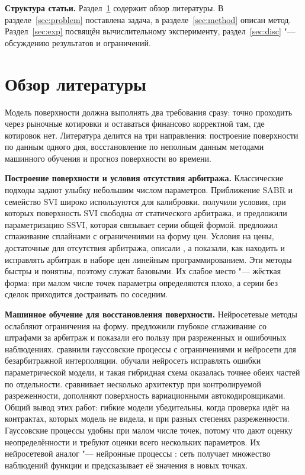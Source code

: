 \documentclass{article}
\begin{document}
\textbf{Структура статьи.} Раздел~\ref{sec:rw} содержит обзор литературы. В разделе~\ref{sec:problem} поставлена задача, в разделе~\ref{sec:method} описан метод. Раздел~\ref{sec:exp} посвящён вычислительному эксперименту, раздел~\ref{sec:disc} "--- обсуждению результатов и ограничений.

\section{Обзор литературы}\label{sec:rw}

Модель поверхности должна выполнять два требования сразу: точно проходить через рыночные котировки и оставаться финансово корректной там, где котировок нет. Литература делится на три направления: построение поверхности по данным одного дня, восстановление по неполным данным методами машинного обучения и прогноз поверхности во времени.

\textbf{Построение поверхности и условия отсутствия арбитража.}
Классические подходы задают улыбку небольшим числом параметров. Приближение SABR \citep{hagan2002sabr} и семейство SVI широко используются для калибровки. \citet{gatheral2014arbitrage} получили условия, при которых поверхность SVI свободна от статического арбитража, и предложили параметризацию SSVI, которая связывает серии общей формой. \citet{fengler2009arbitrage} предложил сглаживание сплайнами с ограничениями на форму цен. Условия на цены, достаточные для отсутствия арбитража, описали \citet{carr2005note}, а \citet{cohen2020detecting} показали, как находить и исправлять арбитраж в наборе цен линейным программированием. Эти методы быстры и понятны, поэтому служат базовыми. Их слабое место "--- жёсткая форма: при малом числе точек параметры определяются плохо, а серии без сделок приходится достраивать по соседним.

\textbf{Машинное обучение для восстановления поверхности.}
Нейросетевые методы ослабляют ограничения на форму. \citet{ackerer2020deep} предложили глубокое сглаживание со штрафами за арбитраж и показали его пользу при разреженных и ошибочных наблюдениях. \citet{chataigner2021shape} сравнили гауссовские процессы с ограничениями и нейросети для безарбитражной интерполяции. \citet{almeida2023machine} обучали нейросеть исправлять ошибки параметрической модели, и такая гибридная схема оказалась точнее обеих частей по отдельности. \citet{rodriguez2026reconstruction} сравнивает несколько архитектур при контролируемой разреженности, \citet{nteumagne2025vae} дополняют поверхность вариационными автокодировщиками. Общий вывод этих работ: гибкие модели убедительны, когда проверка идёт на контрактах, которых модель не видела, и при разных степенях разреженности. Гауссовские процессы \citep{rasmussen2006gaussian} удобны при малом числе точек, потому что дают оценку неопределённости и требуют оценки всего нескольких параметров. Их нейросетевой аналог "--- нейронные процессы \citep{garnelo2018conditional,kim2019attentive}: сеть получает множество наблюдений функции и предсказывает её значения в новых точках.
\end{document}
